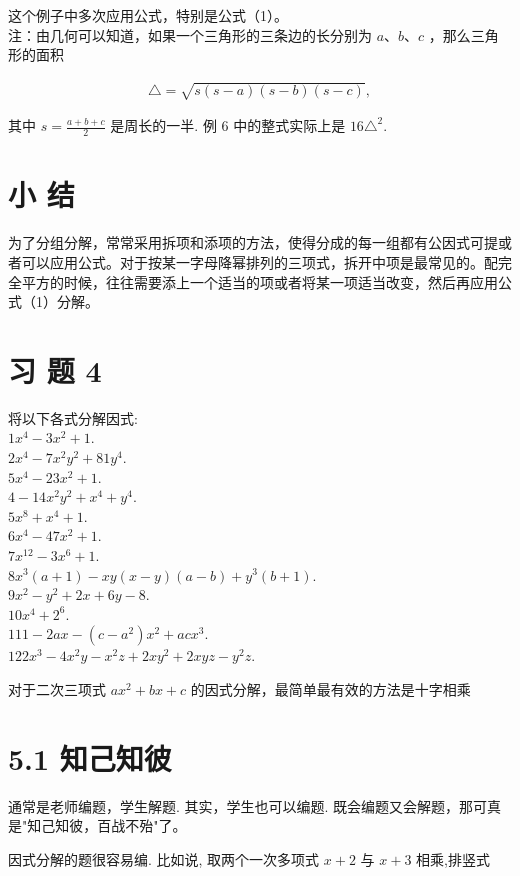 \documentclass[10pt]{article}
\begin{document}
这个例子中多次应用公式，特别是公式（1）。\\
注：由几何可以知道，如果一个三角形的三条边的长分别为 $a 、 b 、 c$ ，那么三角形的面积

\begin{align*}
\triangle=\sqrt{s(s-a)(s-b)(s-c)},
\end{align*}

其中 $s=\frac{a+b+c}{2}$ 是周长的一半. 例 6 中的整式实际上是 $16 \triangle^{2}$.

\section*{小 结}
为了分组分解，常常采用拆项和添项的方法，使得分成的每一组都有公因式可提或者可以应用公式。对于按某一字母降幂排列的三项式，拆开中项是最常见的。配完全平方的时候，往往需要添上一个适当的项或者将某一项适当改变，然后再应用公式（1）分解。

\section*{习 题 4}
将以下各式分解因式:\\
$1 x^{4}-3 x^{2}+1$.\\
$2 x^{4}-7 x^{2} y^{2}+81 y^{4}$.\\
$5 x^{4}-23 x^{2}+1$.\\
$4-14 x^{2} y^{2}+x^{4}+y^{4}$.\\
$5 x^{8}+x^{4}+1$.\\
$6 x^{4}-47 x^{2}+1$.\\
$7 x^{12}-3 x^{6}+1$.\\
$8 x^{3}(a+1)-x y(x-y)(a-b)+y^{3}(b+1)$.\\
$9 x^{2}-y^{2}+2 x+6 y-8$.\\
$10 x^{4}+2^{6}$.\\
$111-2 a x-\left(c-a^{2}\right) x^{2}+a c x^{3}$.\\
$122 x^{3}-4 x^{2} y-x^{2} z+2 x y^{2}+2 x y z-y^{2} z$.

对于二次三项式 $a x^{2}+b x+c$ 的因式分解，最简单最有效的方法是十字相乘

\section*{5.1 知己知彼}
通常是老师编题，学生解题. 其实，学生也可以编题. 既会编题又会解题，那可真是"知己知彼，百战不殆"了。

因式分解的题很容易编. 比如说, 取两个一次多项式 $x+2$ 与 $x+3$ 相乘,排竖式
\end{document}
